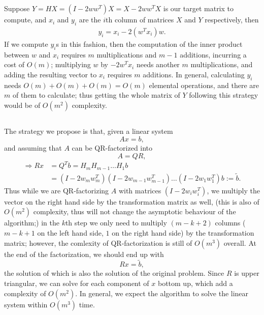 \documentclass[11pt]{article}
\begin{document}
\section{}
\subsection{}
Suppose $Y = HX=(I-2ww^T)X=X-2ww^TX$ is our target matrix to compute, and ${x_i}$ and ${y_i}$ are the $i$th column of matrices $X$ and $Y$ respectively, then
\begin{equation}\begin{split} 
y_i = x_i -2(w^Tx_i)w.
\end{split}\nonumber\end{equation} 
If we compute $y_i$s in this fashion, then the computation of the inner product between $w$ and $x_i$ requires $m$ multiplications and $m-1$ additions, incurring a cost of $O(m)$; multiplying $w$ by $-2w^Tx_i$ needs another $m$ multiplications, and adding the resulting vector to $x_i$ requires $m$ additions. In general, calculating $y_i$ needs $O(m)+O(m) + O(m) = O(m)$ elemental operations, and there are $m$ of them to calculate; thus getting the whole matrix of $Y$ following this strategy would be of $O(m^2)$ complexity.

\subsection{}
The strategy we propose is that, given a linear system $$Ax = b,$$ and assuming that $A$ can be QR-factorized into $$A = QR,$$ 
\begin{equation}\begin{split}
\Rightarrow Rx&=Q^Tb=H_mH_{m-1}\dots H_1b \\
&= (I-2w_mw_m^T)(I-2w_{m-1}w_{m-1}^T)\dots(I-2w_1w_1^T)b :=\tilde b.
\end{split}\nonumber\end{equation} 
Thus while we are QR-factorizing $A$ with matrices $(I-2w_iw_i^T)$, we multiply the vector on the right hand side by the transformation matrix as well, (this is also of $O(m^2)$ complexity, thus will not change the asymptotic behaviour of the algorithm;) in the $k$th step we only need to multiply $(m-k+2)$ columns ($m-k+1$ on the left hand side, $1$ on the right hand side) by the transformation matrix; however, the comlexity of QR-factorization is still of $O(m^3)$ overall. At the end of the factorization, we should end up with $$Rx=\tilde b,$$ the solution of which is also the solution of the original problem. Since $R$ is upper triangular, we can solve for each component of $x$ bottom up, which add a complexity of $O(m^2)$. In general, we expect the algorithm to solve the linear system within $O(m^3)$ time.
\end{document}
